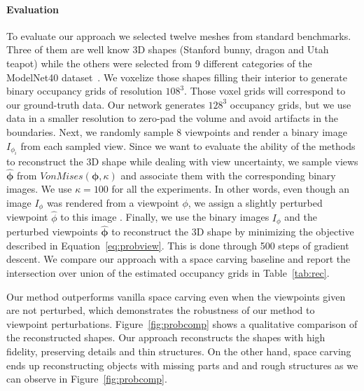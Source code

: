 \paragraph*{Evaluation}
To evaluate our approach we selected twelve meshes from standard benchmarks.
Three of them are well know 3D shapes (Stanford bunny, dragon and Utah teapot) while the others were selected from 9
different categories of the ModelNet40 dataset~\cite{modelnet}.
We voxelize those shapes filling their interior to generate binary occupancy grids of resolution $108^3$.
Those voxel grids will correspond to our ground-truth data.
Our network generates $128^3$ occupancy grids, but we use data in a smaller resolution to zero-pad the volume and avoid
artifacts in the boundaries.
Next, we randomly sample 8 viewpoints and render a binary image $I_{\phi_i}$ from each sampled view.
Since we want to evaluate the ability of the methods to reconstruct the 3D shape while dealing with view uncertainty,
we sample views $\hat{\bm{\phi}}$ from $VonMises(\bm{\phi}, \kappa)$ and associate them with the corresponding binary images.
We use $\kappa=100$ for all the experiments.
In other words, even though an image $I_\phi$ was rendered from a viewpoint $\phi$, we assign a slightly
perturbed viewpoint $\hat{\phi}$ to this image .
Finally, we use the binary images $I_\phi$ and the perturbed
viewpoints $\hat{\bm{\phi}}$ to reconstruct the 3D shape by minimizing
the objective
described in Equation~\ref{eq:probview}.
This is done through 500 steps of gradient descent.
We compare our approach with a space carving baseline and report the intersection over union of the estimated occupancy grids in Table~\ref{tab:rec}.

Our method outperforms vanilla space carving even when the viewpoints given are not perturbed, which demonstrates the robustness of our method
to viewpoint perturbations.
Figure~\ref{fig:probcomp} shows a qualitative comparison of the reconstructed shapes.
Our approach reconstructs the shapes with high fidelity, preserving details and thin structures.
On the other hand, space carving ends up reconstructing objects with missing parts and
and rough structures as we can observe in Figure~\ref{fig:probcomp}.

